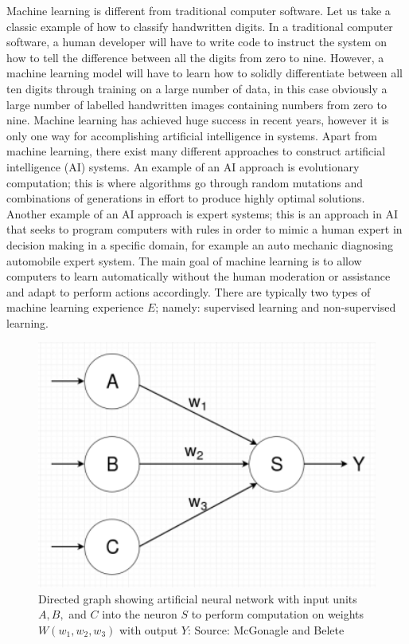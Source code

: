 \documentclass[master]{thesis-uestc}
\begin{document}
Machine learning is different from traditional computer software. Let us take a classic example of how to classify handwritten digits. In a traditional computer software, a human developer will have to write code to instruct the system on how to tell the difference between all the digits from zero to nine. However, a machine learning model will have to learn how to solidly differentiate between all ten digits through training on a large number of data, in this case obviously a large number of labelled handwritten images containing numbers from zero to nine. Machine learning has achieved huge success in recent years, however it is only one way for accomplishing artificial intelligence in systems. Apart from machine learning, there exist many different approaches to construct artificial intelligence (AI) systems. An example of an AI approach is evolutionary computation; this is where algorithms go through random mutations and combinations of generations in effort to produce highly optimal solutions. Another example of an AI approach is expert systems; this is an approach in AI that seeks to program computers with rules in order to mimic a human expert in decision making in a specific domain, for example an auto mechanic diagnosing automobile expert system. The main goal of machine learning is to allow computers to learn automatically without the human moderation or assistance and adapt to perform actions accordingly. There are typically two types of machine learning experience $E$; namely: supervised learning and non-supervised learning.

\begin{figure}[ht]
\includegraphics[width=5in]{pic/neuron.png}
\caption{Directed graph showing artificial neural network with input units $A, B,$ and $C$ into the neuron $S$ to perform computation on weights $W (w_1, w_2, w_3)$ with output $Y$: Source: McGonagle and Belete\cite{McGonagle}}
\label{fig_neuron}
\end{figure}
\end{document}

